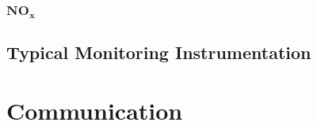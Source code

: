 \subsubsection{$\mathbf{NO_x}$}



\subsection{Typical Monitoring Instrumentation}


\section{Communication}

\section{}
